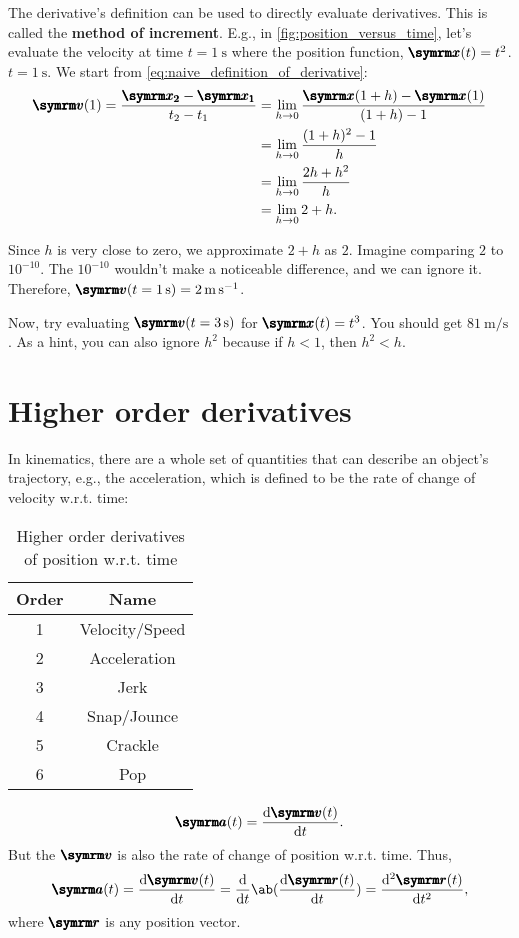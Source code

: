 The derivative's definition can be used to directly evaluate derivatives. This is called the \textbf{method of increment}. E.g., in \cref{fig:position_versus_time}, let's evaluate the velocity at time $t = \qty{1}{\second}$ where the position function, $\vv{x}(t) = t^2$. $t = \qty{1}{\second}$. We start from \cref{eq:naive_definition_of_derivative}:
\begin{align*}
    \vv{v}(1) = \frac{\vv{x_2} - \vv{x_1}}{t_2 - t_1} &= \lim_{h \appr 0}\frac{\vv{x}(1 + h) - \vv{x}(1)}{(1 + h) - 1} \\
    &= \lim_{h \appr 0}\frac{(1 + h)^2 - 1}{h} \\
    &= \lim_{h \appr 0}\frac{2h + h^2}{h} \\
    &= \lim_{h \appr 0}2 + h.
\end{align*}

Since $h$ is very close to zero, we approximate $2 + h$ as $2$. Imagine comparing $2$ to $10^{-10}$. The $10^{-10}$ wouldn't make a noticeable difference, and we can ignore it. Therefore, $\vv{v}(t = \qty{1}{\second}) = \qty{2}{\meter\per\second}$.

Now, try evaluating $\vv{v}(t = \qty{3}{\second})$ for $\vv{x}(t) = t^3$. You should get $\qty{81}{\meter\per\second}$. As a hint, you can also ignore $h^2$ because if $h < 1$, then $h^2 < h$.

\section{Higher order derivatives}

In kinematics, there are a whole set of quantities that can describe an object's trajectory, e.g., the acceleration, which is defined to be the rate of change of velocity w.r.t. time:

\begin{wraptable}[14]{l}{0.36\textwidth}
    \begin{tabular}{c | c}
        Order & Name \\
        \hline
        1 & Velocity/Speed \\
        2 & Acceleration \\
        3 & Jerk \\
        4 & Snap/Jounce \\
        5 & Crackle \\
        6 & Pop
    \end{tabular}
    \caption{Higher order derivatives of position w.r.t. time}
    \label{tab:jerksnapcracklepop}
\end{wraptable}
\begin{equation*}
    \vv{a}(t) = \odv{\vv{v}(t)}{t}.
\end{equation*}
But the $\vv{v}$ is also the rate of change of position w.r.t. time. Thus,
\begin{equation*}
    \vv{a}(t) = \odv{\vv{v}(t)}{t} = \odv*{\ab(\odv{\vv{r}(t)}{t})}{t} = \odv[ord = 2]{\vv{r}(t)}{t}, 
\end{equation*}
where $\vv{r}$ is any position vector.

